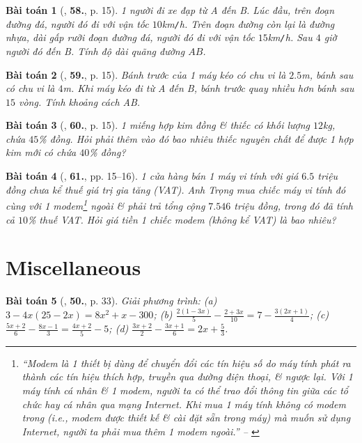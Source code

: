 \documentclass{article}
\numberwithin{equation}{section}
\newtheorem{baitoan}{Bài toán}
\begin{document}
\begin{baitoan}[\cite{SBT_Toan_8_tap_2}, \textbf{58.}, p. 15]
	1 người đi xe đạp từ A đến B. Lúc đầu, trên đoạn đường đá, người đó đi với vận tốc $10$\emph{km\texttt{/}h}. Trên đoạn đường còn lại là đường nhựa, dài gấp rưỡi đoạn đường đá, người đó đi với vận tốc $15$\emph{km\texttt{/}h}. Sau $4$ giờ người đó đến B. Tính độ dài quãng đường $AB$.
\end{baitoan}

\begin{baitoan}[\cite{SBT_Toan_8_tap_2}, \textbf{59.}, p. 15]
	Bánh trước của 1 máy kéo có chu vi là $2.5$\emph{m}, bánh sau có chu vi là $4$\emph{m}. Khi máy kéo đi từ A đến B, bánh trước quay nhiều hơn bánh sau $15$ vòng. Tính khoảng cách AB.
\end{baitoan}

\begin{baitoan}[\cite{SBT_Toan_8_tap_2}, \textbf{60.}, p. 15]
	1 miếng hợp kim đồng \& thiếc có khối lượng $12$\emph{kg}, chứa $45$\% đồng. Hỏi phải thêm vào đó bao nhiêu thiếc nguyên chất để được 1 hợp kim mới có chứa $40$\% đồng?
\end{baitoan}

\begin{baitoan}[\cite{SBT_Toan_8_tap_2}, \textbf{61.}, pp. 15--16]
	1 cửa hàng bán 1 máy vi tính với giá $6.5$ triệu đồng chưa kể thuế giá trị gia tăng (VAT). Anh Trọng mua chiếc máy vi tính đó cùng với 1 modem\footnote{``Modem là 1 thiết bị dùng để chuyển đổi các tín hiệu số do máy tính phát ra thành các tín hiệu thích hợp, truyền qua đường điện thoại, \& ngược lại. Với 1 máy tính cá nhân \& 1 modem, người ta có thể trao đổi thông tin giữa các tổ chức hay cá nhân qua mạng Internet. Khi mua 1 máy tính không có modem trong (i.e., modem được thiết kế \& cài đặt sẵn trong máy) mà muốn sử dụng Internet, người ta phải mua thêm 1 modem ngoài.'' -- \cite[p. 15]{SBT_Toan_8_tap_2}} ngoài \& phải trả tổng cộng $7.546$ triệu đồng, trong đó đã tính cả $10$\% thuế VAT. Hỏi giá tiền 1 chiếc modem (không kể VAT) là bao nhiêu?
\end{baitoan}


\section{Miscellaneous}

\begin{baitoan}[\cite{SGK_Toan_8_tap_2}, \textbf{50.}, p. 33]
	Giải phương trình: (a) $3 - 4x(25 - 2x) = 8x^2 + x - 300$; (b) $\frac{2(1 - 3x)}{5} - \frac{2 + 3x}{10} = 7 - \frac{3(2x + 1)}{4}$; (c) $\frac{5x + 2}{6} - \frac{8x - 1}{3} = \frac{4x + 2}{5} - 5$; (d) $\frac{3x + 2}{2} - \frac{3x + 1}{6} = 2x + \frac{5}{3}$.
\end{baitoan}
\end{document}
